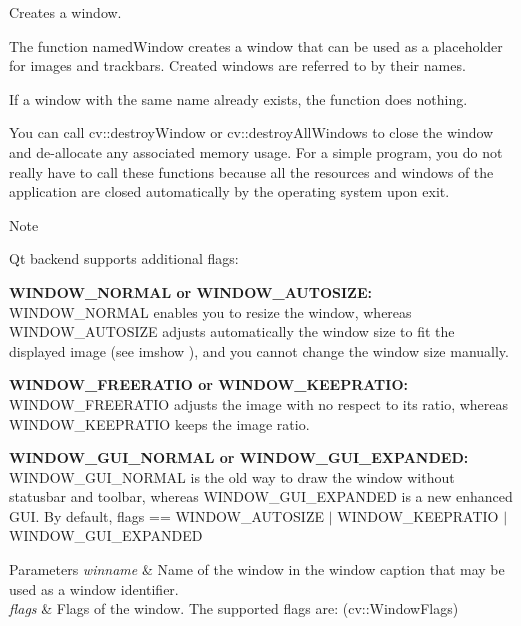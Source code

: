 Creates a window. 

The function named\+Window creates a window that can be used as a placeholder for images and trackbars. Created windows are referred to by their names. 

If a window with the same name already exists, the function does nothing. 

You can call cv\+::destroy\+Window or cv\+::destroy\+All\+Windows to close the window and de-\/allocate any associated memory usage. For a simple program, you do not really have to call these functions because all the resources and windows of the application are closed automatically by the operating system upon exit. 

\begin{DoxyNote}{Note}

\end{DoxyNote}
Qt backend supports additional flags\+:
\begin{DoxyItemize}
\item {\bfseries W\+I\+N\+D\+O\+W\+\_\+\+N\+O\+R\+M\+AL or W\+I\+N\+D\+O\+W\+\_\+\+A\+U\+T\+O\+S\+I\+ZE\+:} W\+I\+N\+D\+O\+W\+\_\+\+N\+O\+R\+M\+AL enables you to resize the window, whereas W\+I\+N\+D\+O\+W\+\_\+\+A\+U\+T\+O\+S\+I\+ZE adjusts automatically the window size to fit the displayed image (see imshow ), and you cannot change the window size manually.
\item {\bfseries W\+I\+N\+D\+O\+W\+\_\+\+F\+R\+E\+E\+R\+A\+T\+IO or W\+I\+N\+D\+O\+W\+\_\+\+K\+E\+E\+P\+R\+A\+T\+IO\+:} W\+I\+N\+D\+O\+W\+\_\+\+F\+R\+E\+E\+R\+A\+T\+IO adjusts the image with no respect to its ratio, whereas W\+I\+N\+D\+O\+W\+\_\+\+K\+E\+E\+P\+R\+A\+T\+IO keeps the image ratio.
\item {\bfseries W\+I\+N\+D\+O\+W\+\_\+\+G\+U\+I\+\_\+\+N\+O\+R\+M\+AL or W\+I\+N\+D\+O\+W\+\_\+\+G\+U\+I\+\_\+\+E\+X\+P\+A\+N\+D\+ED\+:} W\+I\+N\+D\+O\+W\+\_\+\+G\+U\+I\+\_\+\+N\+O\+R\+M\+AL is the old way to draw the window without statusbar and toolbar, whereas W\+I\+N\+D\+O\+W\+\_\+\+G\+U\+I\+\_\+\+E\+X\+P\+A\+N\+D\+ED is a new enhanced G\+UI. By default, flags == W\+I\+N\+D\+O\+W\+\_\+\+A\+U\+T\+O\+S\+I\+ZE $\vert$ W\+I\+N\+D\+O\+W\+\_\+\+K\+E\+E\+P\+R\+A\+T\+IO $\vert$ W\+I\+N\+D\+O\+W\+\_\+\+G\+U\+I\+\_\+\+E\+X\+P\+A\+N\+D\+ED 
\end{DoxyItemize}


\begin{DoxyParams}{Parameters}
{\em winname} & Name of the window in the window caption that may be used as a window identifier. \\
\hline
{\em flags} & Flags of the window. The supported flags are\+: (cv\+::\+Window\+Flags) \\
\hline
\end{DoxyParams}
\mbox{\label{group__highgui_ga4e805fd30f0df6fd2b5715cf89f4f80e}} 
